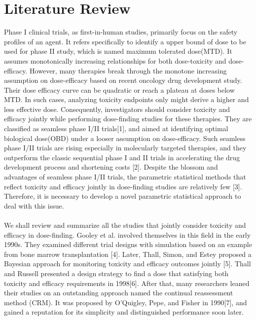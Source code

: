 \documentclass[12pt]{article}
\begin{document}
\section{Literature Review}
Phase I clinical trials, as first-in-human studies, primarily focus on the safety profiles of an agent. It refers specifically to identify a upper bound of dose to be used for phase II study, which is named maximum tolerated dose(MTD). It assumes monotonically increasing relationships for both dose-toxicity and dose-efficacy. However, many therapies break through the monotone increasing assumption on dose-efficacy based on recent oncology drug development study. Their dose efficacy curve can be quadratic or reach a plateau at doses below MTD. In such cases, analyzing toxicity endpoints only might derive a higher and less effective dose. Consequently, investigators should consider toxicity and efficacy jointly while performing dose-finding studies for these therapies. They are classified as seamless phase I/II trials[1], and aimed at identifying optimal biological dose(OBD) under a looser assumption on dose-efficacy. Such seamless phase I/II trials are rising especially in molecularly targeted therapies, and they outperform the classic sequential phase I and II trials in accelerating the drug development process and shortening costs [2]. Despite the blossom and advantages of seamless phase I/II trials, the parametric statistical methods that reflect toxicity and efficacy jointly in dose-finding studies are relatively few [3]. Therefore, it is necessary to develop a novel parametric statistical approach to deal with this issue.\\
\\
 We shall review and summarize all the studies that jointly consider toxicity and efficacy in dose-finding. Gooley et al. involved themselves in this field in the early 1990s. They examined different trial designs with simulation based on an example from bone marrow transplantation [4]. Later, Thall, Simon, and Estey proposed a Bayesian approach for monitoring toxicity and efficacy outcomes jointly [5]. Thall and Russell presented a design strategy to find a dose that satisfying both toxicity and efficacy requirements in 1998[6]. After that, many researchers leaned their studies on an outstanding approach named the continual reassessment method (CRM). It was proposed by O'Quigley, Pepe, and Fisher in 1990[7], and gained a reputation for its simplicity and distinguished performance soon later.\\
 \\
\end{document}
